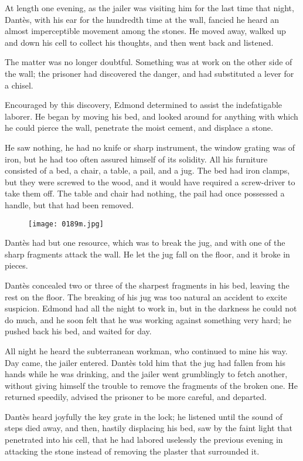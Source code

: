 At length one evening, as the jailer was visiting him for the last time
that night, Dantès, with his ear for the hundredth time at the wall,
fancied he heard an almost imperceptible movement among the stones. He
moved away, walked up and down his cell to collect his thoughts, and
then went back and listened.

The matter was no longer doubtful. Something was at work on the other
side of the wall; the prisoner had discovered the danger, and had
substituted a lever for a chisel.

Encouraged by this discovery, Edmond determined to assist the
indefatigable laborer. He began by moving his bed, and looked around
for anything with which he could pierce the wall, penetrate the moist
cement, and displace a stone.

He saw nothing, he had no knife or sharp instrument, the window grating
was of iron, but he had too often assured himself of its solidity. All
his furniture consisted of a bed, a chair, a table, a pail, and a jug.
The bed had iron clamps, but they were screwed to the wood, and it
would have required a screw-driver to take them off. The table and
chair had nothing, the pail had once possessed a handle, but that had
been removed.

\begin{figure}[h]
\texttt{[image: 0189m.jpg]}
\end{figure}

Dantès had but one resource, which was to break the jug, and with one
of the sharp fragments attack the wall. He let the jug fall on the
floor, and it broke in pieces.

Dantès concealed two or three of the sharpest fragments in his bed,
leaving the rest on the floor. The breaking of his jug was too natural
an accident to excite suspicion. Edmond had all the night to work in,
but in the darkness he could not do much, and he soon felt that he was
working against something very hard; he pushed back his bed, and waited
for day.

All night he heard the subterranean workman, who continued to mine his
way. Day came, the jailer entered. Dantès told him that the jug had
fallen from his hands while he was drinking, and the jailer went
grumblingly to fetch another, without giving himself the trouble to
remove the fragments of the broken one. He returned speedily, advised
the prisoner to be more careful, and departed.

Dantès heard joyfully the key grate in the lock; he listened until the
sound of steps died away, and then, hastily displacing his bed, saw by
the faint light that penetrated into his cell, that he had labored
uselessly the previous evening in attacking the stone instead of
removing the plaster that surrounded it.

